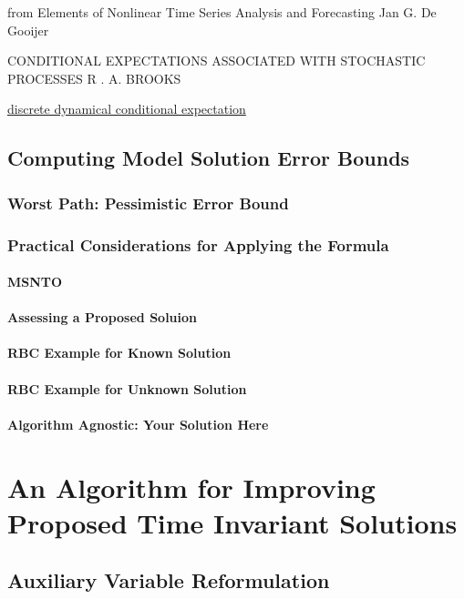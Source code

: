 \documentclass[12pt]{article}
\begin{document}
  from  Elements of Nonlinear Time Series Analysis and Forecasting  Jan G. De Gooijer

CONDITIONAL EXPECTATIONS ASSOCIATED WITH STOCHASTIC PROCESSES
R . A. BROOKS


\href{http://www.pnas.org/content/103/11/3968.full}{discrete dynamical conditional expectation} 

\subsection{Computing Model Solution Error Bounds}
\label{sec:solnerrorbounds}

\subsubsection{Worst Path: Pessimistic Error Bound}
\label{worst}

\subsubsection{Practical Considerations for Applying the Formula}
\label{sec:practicalformula}


\paragraph{MSNTO}
\paragraph{Assessing a Proposed Soluion}
\paragraph{RBC Example for Known Solution}
\paragraph{RBC Example for Unknown Solution}
\paragraph{Algorithm Agnostic: Your Solution Here}

\section{An Algorithm for Improving Proposed Time Invariant Solutions}
\label{sec:algoforsoln}

\subsection{Auxiliary Variable Reformulation}
\label{sec:aux}
\end{document}
